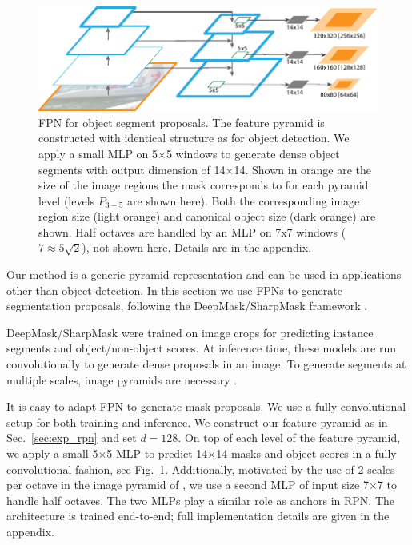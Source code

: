\documentclass[10pt,twocolumn,letterpaper]{article}
\def\x{$\times$}
\begin{document}
\begin{figure}[t]
\centering
\includegraphics[width=1\linewidth]{ai/masks}
\caption{FPN for object segment proposals. The feature pyramid is constructed with identical structure as for object detection. We apply a small MLP on 5\x5 windows to generate dense object segments with output dimension of 14\x14. Shown in orange are the size of the image regions the mask corresponds to for each pyramid level (levels $P_{3-5}$ are shown here). Both the corresponding image region size (light orange) and canonical object size (dark orange) are shown. Half octaves are handled by an MLP on 7x7 windows ($7\approx5\sqrt2$), not shown here. Details are in the appendix.
}\vspace{-3mm}
\label{fig:masks}
\end{figure}

Our method is a generic pyramid representation and can be used in applications other than object detection.
In this section we use FPNs to generate segmentation proposals, following the DeepMask/SharpMask framework \cite{Pinheiro2015,Pinheiro2016}.

DeepMask/SharpMask were trained on image crops for predicting instance segments and object/non-object scores.
At inference time, these models are run convolutionally to generate dense proposals in an image.
To generate segments at multiple scales, image pyramids are necessary \cite{Pinheiro2015,Pinheiro2016}.

It is easy to adapt FPN to generate mask proposals.
We use a fully convolutional setup for both training and inference.
We construct our feature pyramid as in Sec.~\ref{sec:exp_rpn} and set $d=128$.
On top of each level of the feature pyramid, we apply a small 5\x5 MLP to predict 14\x14 masks and object scores in a fully convolutional fashion, see Fig.~\ref{fig:masks}.
Additionally, motivated by the use of 2 scales per octave in the image pyramid of \cite{Pinheiro2015,Pinheiro2016}, we use a second MLP of input size 7\x7 to handle half octaves.
The two MLPs play a similar role as anchors in RPN.
The architecture is trained end-to-end; full implementation details are given in the appendix.
\end{document}
